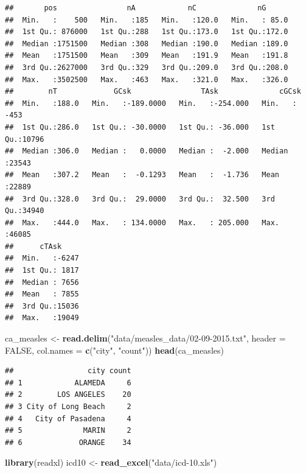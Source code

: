 \documentclass[]{book}
\makeatletter
\newenvironment{Shaded}{\begin{snugshade}}{\end{snugshade}}
\newcommand{\KeywordTok}[1]{\textcolor[rgb]{0.13,0.29,0.53}{\textbf{{#1}}}}
\newcommand{\DataTypeTok}[1]{\textcolor[rgb]{0.13,0.29,0.53}{{#1}}}
\newcommand{\StringTok}[1]{\textcolor[rgb]{0.31,0.60,0.02}{{#1}}}
\newcommand{\OtherTok}[1]{\textcolor[rgb]{0.56,0.35,0.01}{{#1}}}
\newcommand{\NormalTok}[1]{{#1}}
\newenvironment{kframe}{%
\medskip{}
\setlength{\fboxsep}{.8em}
 \def\at@end@of@kframe{}%
 \ifinner\ifhmode%
  \def\at@end@of@kframe{\end{minipage}}%
  \begin{minipage}{\columnwidth}%
 \fi\fi%
 \def\FrameCommand##1{\hskip\@totalleftmargin \hskip-\fboxsep
 \colorbox{shadecolor}{##1}\hskip-\fboxsep
     \hskip-\linewidth \hskip-\@totalleftmargin \hskip\columnwidth}%
 \MakeFramed {\advance\hsize-\width
   \@totalleftmargin\z@ \linewidth\hsize
   \@setminipage}}%
 {\par\unskip\endMakeFramed%
 \at@end@of@kframe}
\renewenvironment{Shaded}{\begin{kframe}}{\end{kframe}}
\makeatother
\begin{document}
\begin{verbatim}
##       pos                nA            nC              nG       
##  Min.   :    500   Min.   :185   Min.   :120.0   Min.   : 85.0  
##  1st Qu.: 876000   1st Qu.:288   1st Qu.:173.0   1st Qu.:172.0  
##  Median :1751500   Median :308   Median :190.0   Median :189.0  
##  Mean   :1751500   Mean   :309   Mean   :191.9   Mean   :191.8  
##  3rd Qu.:2627000   3rd Qu.:329   3rd Qu.:209.0   3rd Qu.:208.0  
##  Max.   :3502500   Max.   :463   Max.   :321.0   Max.   :326.0  
##        nT             GCsk                TAsk              cGCsk      
##  Min.   :188.0   Min.   :-189.0000   Min.   :-254.000   Min.   : -453  
##  1st Qu.:286.0   1st Qu.: -30.0000   1st Qu.: -36.000   1st Qu.:10796  
##  Median :306.0   Median :   0.0000   Median :  -2.000   Median :23543  
##  Mean   :307.2   Mean   :  -0.1293   Mean   :  -1.736   Mean   :22889  
##  3rd Qu.:328.0   3rd Qu.:  29.0000   3rd Qu.:  32.500   3rd Qu.:34940  
##  Max.   :444.0   Max.   : 134.0000   Max.   : 205.000   Max.   :46085  
##      cTAsk      
##  Min.   :-6247  
##  1st Qu.: 1817  
##  Median : 7656  
##  Mean   : 7855  
##  3rd Qu.:15036  
##  Max.   :19049
\end{verbatim}

\begin{Shaded}
\begin{Highlighting}[]
\NormalTok{ca_measles <-}\StringTok{ }\KeywordTok{read.delim}\NormalTok{(}\StringTok{"data/measles_data/02-09-2015.txt"}\NormalTok{,}
                         \DataTypeTok{header =} \OtherTok{FALSE}\NormalTok{, }\DataTypeTok{col.names =} \KeywordTok{c}\NormalTok{(}\StringTok{"city"}\NormalTok{, }\StringTok{"count"}\NormalTok{))}
\KeywordTok{head}\NormalTok{(ca_measles)}
\end{Highlighting}
\end{Shaded}

\begin{verbatim}
##                 city count
## 1            ALAMEDA     6
## 2        LOS ANGELES    20
## 3 City of Long Beach     2
## 4   City of Pasadena     4
## 5              MARIN     2
## 6             ORANGE    34
\end{verbatim}

\begin{Shaded}
\begin{Highlighting}[]
\KeywordTok{library}\NormalTok{(readxl)}
\NormalTok{icd10 <-}\StringTok{ }\KeywordTok{read_excel}\NormalTok{(}\StringTok{"data/icd-10.xls"}\NormalTok{)}
\end{Highlighting}
\end{Shaded}
\end{document}
